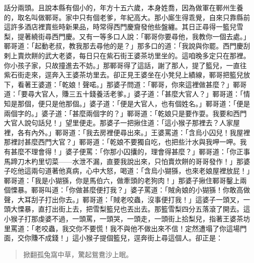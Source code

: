 話分兩頭。且說本縣有個小的，年方十五六歲，本身姓喬，因為做軍在鄆州生養的，取名叫做鄆哥。家中只有個老爹，年紀高大。那小廝生得乖覺，自來只靠縣前這許多酒店裡賣些時新果品，時常得西門慶齎發他些盤纏。其日正尋得一籃兒雪梨，提著繞街尋西門慶。又有一等多口人說：「鄆哥你要尋他，我教你一個去處。」鄆哥道：「起動老叔，教我那去尋他的是？」那多口的道：「我說與你罷。西門慶刮剌上賣炊餅的武大老婆，每日只在紫石街王婆茶坊里坐的。這咱晚多定只在那裡。你小孩子家，只故撞進去不妨。」那鄆哥得了這話，謝了那人，提了籃兒，一直往紫石街走來，逕奔入王婆茶坊里去。卻正見王婆坐在小凳兒上績線，鄆哥把籃兒放下，看著王婆道：「乾娘！聲喏。」那婆子問道：「鄆哥，你來這裡做甚麼？」鄆哥道：「要尋大官人，賺三五十錢養活老爹。」婆子道：「甚麼大官人？」鄆哥道：「情知是那個，便只是他那個。」婆子道：「便是大官人，也有個姓名。」鄆哥道：「便是兩個字的。」婆子道：「甚麼兩個字的？」鄆哥道：「乾娘只是要作耍。我要和西門大官人說句話兒！」望里便走。那婆子一把揪住道：「這小猴子那裡去？人家屋裡，各有內外。」鄆哥道：「我去房裡便尋出來。」王婆罵道：「含烏小囚兒！我屋裡那裡討甚麼西門大官？」鄆哥道：「乾娘不要獨自吃，也把些汁水與我呷一呷。我有甚麼不理會得！」婆子便罵：「你那小囚攮的，理會得甚麼？」鄆哥道：「你正事馬蹄刀木杓里切菜——水泄不漏，直要我說出來，只怕賣炊餅的哥哥發作！」那婆子吃他這兩句道著他真病，心中大怒，喝道：「含烏小猢猻，也來老娘屋裡放屁！」鄆哥道：「我是小猢猻，你是馬伯六，做牽頭的老狗肉！」那婆子揪住鄆哥鑿上兩個慄暴。鄆哥叫道：「你做甚麼便打我？」婆子罵道：「賊肏娘的小猢猻！你敢高做聲，大耳刮子打出你去。」鄆哥道：「賊老咬蟲，沒事便打我！」這婆子一頭叉，一頭大慄暴，直打出街上去，把雪梨籃兒也丟出去。那籃雪梨四分五落滾了開去。這小猴子打那虔婆不過，一頭罵，一頭哭，一頭走，一頭街上拾梨兒，指著王婆茶坊里罵道：「老咬蟲，我交你不要慌！我不與他不做出來不信！定然遭塌了你這場門面，交你賺不成錢！」這小猴子提個籃兒，逕奔街上尋這個人。卻正是：
\begin{quote}
掀翻孤兔窩中草，驚起鴛鴦沙上眠。
\end{quote}

